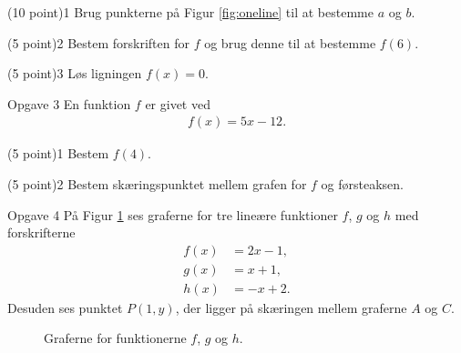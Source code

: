 \begin{delopgave}{(10 point)}{1}
	Brug punkterne på Figur \ref{fig:oneline} til at bestemme $a$ og $b$. 
\end{delopgave}
\begin{delopgave}{(5 point)}{2}
	Bestem forskriften for $f$ og brug denne til at bestemme $f(6)$. 
\end{delopgave}
\begin{delopgave}{(5 point)}{3}
	Løs ligningen $f(x) = 0$.
\end{delopgave}
\begin{opgavetekst}{Opgave 3}
En funktion $f$ er givet ved 
\begin{align*}
f(x) = 5x - 12.
\end{align*}
\end{opgavetekst}
\begin{delopgave}{(5 point)}{1}
		Bestem $f(4)$.
\end{delopgave}
\begin{delopgave}{(5 point)}{2}
	Bestem skæringspunktet mellem grafen for $f$ og førsteaksen.
\end{delopgave}
\begin{opgavetekst}{Opgave 4}
	På Figur \ref{fig:lines3} ses graferne for tre lineære funktioner $f$, $g$ og $h$ med forskrifterne 
	\begin{align*}
		f(x) &= 2x-1,\\
		g(x) &= x+1,\\
		h(x) &= -x+2.
	\end{align*}
	Desuden ses punktet $P(1,y)$, der ligger på skæringen mellem graferne $A$ og $C$.
	\begin{figure}[H]
		\centering
		\caption{Graferne for funktionerne $f$, $g$ og $h$.}
		\label{fig:lines3}
	\end{figure}\phantom{h}
\end{opgavetekst}
